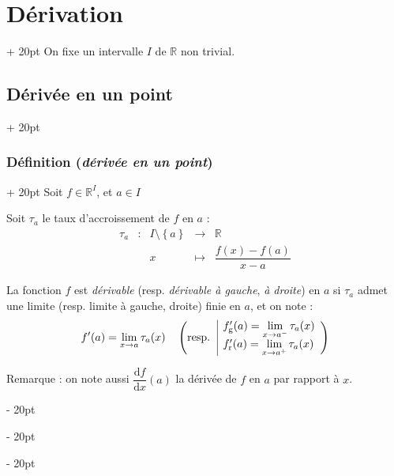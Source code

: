 \documentclass[a4paper, 12pt, twoside]{article}
\newcommand{\R}{\mathbb{R}} %
\newcommand{\lr}[1]{\left( #1 \right)}
\newcommand{\set}[1]{\left\{ #1 \right\}}
\newcommand{\ind}[1][20pt]{\advance\leftskip + #1}
\newcommand{\deind}[1][20pt]{\advance\leftskip - #1}
\newenvironment{indt}[2][20pt]{#2 \par \ind[#1]}{\par \deind} %
\begin{document}
    \begin{indt}{\section{Dérivation}}
        On fixe un intervalle $I$ de $\R$ non trivial.

        \begin{indt}{\subsection{Dérivée en un point}}
            \begin{indt}{\subsubsection{Définition (\textit{dérivée en un point})}}
                Soit $f \in \R^I$, et $a \in I$

                Soit $\tau_a$ le taux d'accroissement de $f$ en $a$ :
                \[
                    \begin{array}{rcccc}
                        \tau_a & : & I \setminus \set a & \longrightarrow & \R
                        \\
                        && x & \longmapsto & \dfrac{f(x) - f(a)}{x - a}
                    \end{array}
                \]

                \vspace{6pt}
                
                La fonction $f$ est \textit{dérivable} (resp. \textit{dérivable à gauche}, \textit{à droite}) en $a$ si $\tau_a$ admet une limite (resp. limite à gauche, droite) finie en $a$, et on note :
                \[
                    f'(a) = \lim_{x \to a} \tau_a(x)
                    \quad \lr{\text{resp.}\ \
                        \begin{array}{|l}
                            f_{\rm g}'(a) = \displaystyle \lim_{x \to a^-} \tau_a(x)
                            \\
                            f_{\rm r}'(a) = \displaystyle \lim_{x \to a^+} \tau_a(x)
                        \end{array}
                    }
                \]

                Remarque : on note aussi $\dfrac{\mathrm d f}{\mathrm dx}(a)$ la dérivée de $f$ en $a$ par rapport à $x$.
            \end{indt}


\end{indt}
\end{indt}
\end{document}
